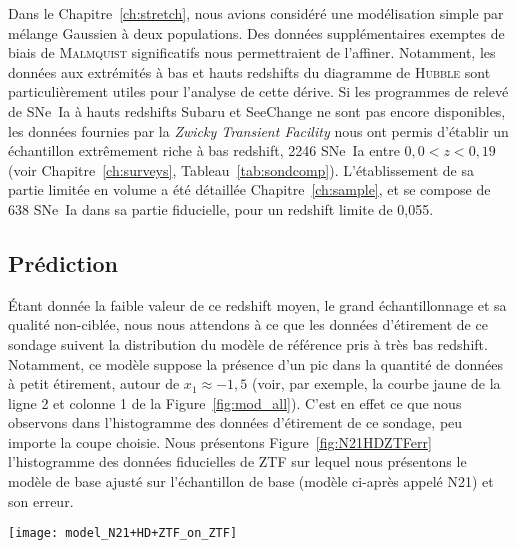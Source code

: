\documentclass[../main/main.tex]{subfiles}
\begin{document}
Dans le Chapitre~\ref{ch:stretch}, nous avions considéré une modélisation simple
par mélange Gaussien à deux populations. Des données supplémentaires exemptes de
biais de \textsc{Malmquist} significatifs nous permettraient de l'affiner.
Notamment, les données aux extrémités à bas et hauts redshifts du diagramme de
\textsc{Hubble} sont particulièrement utiles pour l'analyse de cette dérive. Si
les programmes de relevé de SNe~Ia à hauts redshifts Subaru et SeeChange ne sont
pas encore disponibles, les données fournies par la \textit{Zwicky Transient
Facility} \citep[ZTF,][]{bellm2019, graham2019} nous ont permis d'établir un
échantillon extrêmement riche à bas redshift, 2246 SNe~Ia entre $0,0 < z < 0,19$
(voir Chapitre~\ref{ch:surveys}, Tableau~\ref{tab:sondcomp}). L'établissement de
sa partie limitée en volume a été détaillée Chapitre~\ref{ch:sample}, et se
compose de 638 SNe~Ia dans sa partie fiducielle, pour un redshift limite de
0,055.

\subsection{Prédiction}\label{ssec:xpred}

Étant donnée la faible valeur de ce redshift moyen, le grand échantillonnage et
sa qualité non-ciblée, nous nous attendons à ce que les données d'étirement de
ce sondage suivent la distribution du modèle de référence pris à très bas
redshift. Notamment, ce modèle suppose la présence d'un pic dans la quantité de
données à petit étirement, autour de $x_1 \approx -1,5$ (voir, par exemple, la
courbe jaune de la ligne 2 et colonne 1 de la Figure~\ref{fig:mod_all}). C'est
en effet ce que nous observons dans l'histogramme des données d'étirement de ce
sondage, peu importe la coupe choisie. Nous présentons
Figure~\ref{fig:N21HDZTFerr} l'histogramme des données fiducielles de ZTF sur
lequel nous présentons le modèle de base ajusté sur l'échantillon de base
(modèle ci-après appelé N21) et son erreur.

\begin{SCfigure}[1][ht]
    \texttt{[image: model\_N21+HD+ZTF\_on\_ZTF]}
    \caption[Accord entre les modèles N21+ZTF et HD+ZTF et l'histogramme des
    étirements de ZTF]{\textit{En violet}~: histogramme des étirements de ZTF.
        \textit{En bleu (violet) et leurs bandes}~: modèles de base ajustés sur
        l'échantillon de base, N21 (échantillon avec ZTF, N21+ZTF) au redshift
        moyen de ZTF et leur erreur. \textit{En fin pointillés verts (ligne
        continue)}~: modèles Howell+dérive ajustés sur l'échantillon de base, HD
    (échantillon avec ZTF, HD+ZTF).}
    \label{fig:N21HDZTFerr}
\end{SCfigure}
\end{document}

